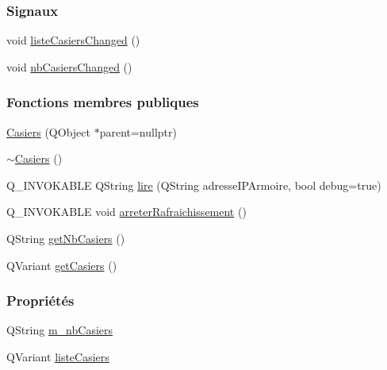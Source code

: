 \subsubsection*{Signaux}
\begin{DoxyCompactItemize}
\item 
void \hyperlink{class_casiers_a25d7a8e09435cb7ee0b9f9e27e52b177}{liste\+Casiers\+Changed} ()
\item 
void \hyperlink{class_casiers_a73cd8be3085cb73651b4dea4d22a667b}{nb\+Casiers\+Changed} ()
\end{DoxyCompactItemize}
\subsubsection*{Fonctions membres publiques}
\begin{DoxyCompactItemize}
\item 
\hyperlink{class_casiers_ae9620f81e704a989f37b5b86e779e3df}{Casiers} (Q\+Object $\ast$parent=nullptr)
\item 
\hyperlink{class_casiers_a12018a7daf2c2ce7652ccedbefc545cc}{$\sim$\+Casiers} ()
\item 
Q\+\_\+\+I\+N\+V\+O\+K\+A\+B\+LE Q\+String \hyperlink{class_casiers_a7b1d58f40217ef13a5dd0d966df38c9a}{lire} (Q\+String adresse\+I\+P\+Armoire, bool debug=true)
\item 
Q\+\_\+\+I\+N\+V\+O\+K\+A\+B\+LE void \hyperlink{class_casiers_ad9a69a4e68885d87318188102f57fdd6}{arreter\+Rafraichissement} ()
\item 
Q\+String \hyperlink{class_casiers_affa8551c477b3cdfe15cd19964d8a391}{get\+Nb\+Casiers} ()
\item 
Q\+Variant \hyperlink{class_casiers_a3c23157572d06e973860c4d9f9589b1e}{get\+Casiers} ()
\end{DoxyCompactItemize}
\subsubsection*{Propriétés}
\begin{DoxyCompactItemize}
\item 
Q\+String \hyperlink{class_casiers_a7c4b1df1f2e320c22489234fee991f18}{m\+\_\+nb\+Casiers}
\item 
Q\+Variant \hyperlink{class_casiers_a936c4711e83f6577852a72909731fd89}{liste\+Casiers}
\end{DoxyCompactItemize}
